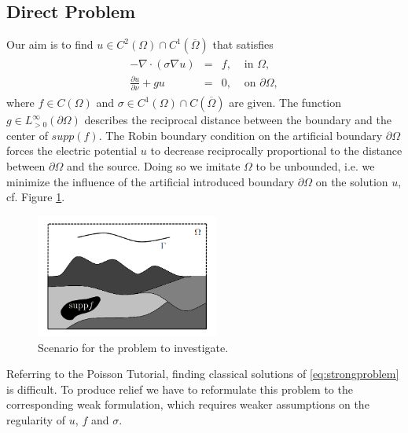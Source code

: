 \documentclass[a4paper, 11pt, twoside]{article}
\begin{document}
\subsection{Direct Problem}
Our aim is to find $u\in C^2(\Omega)\cap C^1(\overline{\Omega})$ that satisfies
%
\begin{eqnarray}\label{eq:strongproblem}
\begin{array}{rcll}
	-\nabla\cdot(\sigma\nabla u) &=& f, & \text{ in }\Omega,\\
	\frac{\partial u}{\partial\nu}+gu &=& 0, & \text{ on }\partial\Omega,
\end{array}
\end{eqnarray}
%
where $f \in C(\Omega)$ and $\sigma\in C^1(\Omega)\cap C(\overline \Omega)$ are given. The function $g\in L^\infty_{>0}(\partial\Omega)$ describes the reciprocal distance between the boundary and the center of $supp(f)$. The Robin boundary condition on the artificial boundary $\partial\Omega$ forces the electric potential $u$ to decrease reciprocally proportional to the distance between $\partial\Omega$ and the source. Doing so we imitate $\Omega$ to be unbounded, i.e. we minimize the influence of the artificial introduced boundary $\partial\Omega$ on the solution $u$, cf. Figure \ref{fig:skizze}.\\

\begin{figure}[ht]
\centering 
\includegraphics[width=6cm]{skizze.png}
\caption{Scenario for the problem to investigate.}
\label{fig:skizze}
\end{figure}
%
Referring to the Poisson Tutorial, finding classical solutions of \eqref{eq:strongproblem} is difficult. To produce relief we have to reformulate this problem to the corresponding weak formulation, which requires weaker assumptions on the regularity of $u$, $f$ and $\sigma$.
\end{document}
